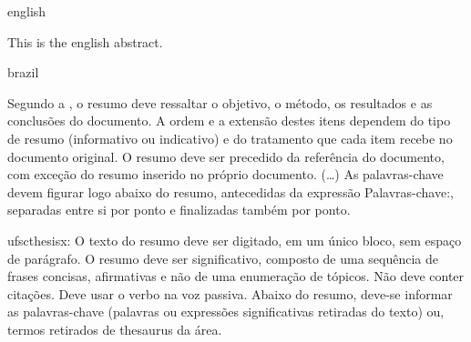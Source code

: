 \swapcontents
{
    \begin{otherlanguage*}{english}
    \begin{resumo}[Abstract]

        This is the english abstract.


    \end{resumo}
    \end{otherlanguage*}
}
{
    \begin{otherlanguage*}{brazil}
    \begin{resumo}[Resumo]

        Segundo a , o resumo deve ressaltar o
        objetivo, o método, os resultados e as conclusões do documento. A ordem e a extensão
        destes itens dependem do tipo de resumo (informativo ou indicativo) e do
        tratamento que cada item recebe no documento original. O resumo deve ser
        precedido da referência do documento, com exceção do resumo inserido no
        próprio documento. (\ldots) As palavras-chave devem figurar logo abaixo do
        resumo, antecedidas da expressão Palavras-chave:, separadas entre si por
        ponto e finalizadas também por ponto.

        ufscthesisx:
        O texto do resumo deve ser digitado, em um único bloco, sem espaço de parágrafo. O resumo deve
        ser significativo, composto de uma sequência de frases concisas, afirmativas e não de uma
        enumeração de tópicos. Não deve conter citações. Deve usar o verbo na voz passiva. Abaixo do
        resumo, deve-se informar as palavras-chave (palavras ou expressões significativas retiradas do
        texto) ou, termos retirados de thesaurus da área. \showfont


    \end{resumo}
    \end{otherlanguage*}
}



